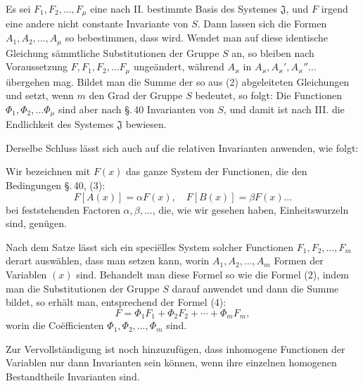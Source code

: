 Es sei $F_1, F_2, \ldots, F_\mu$ eine nach II. bestimmte Basis des Systemes $\mathfrak{J}$, und $F$ irgend eine andere nicht constante Invariante von $S$. Dann lassen sich die Formen $A_1, A_2, \ldots, A_\mu$ so bebestimmen, dass %
wird. Wendet man auf diese identische Gleichung sämmtliche Substitutionen der Gruppe $S$ an, so bleiben nach Voraussetzung $F, F_1, F_2, \ldots F_\mu$ ungeändert, während $A_\varkappa$ in $A_\varkappa, A_\varkappa', A_\varkappa'' \ldots$ übergehen mag. Bildet man die Summe der so aus (2) abgeleiteten Gleichungen und setzt, wenn $m$ den Grad der Gruppe $S$ bedeutet,
so folgt:
Die Functionen $\Phi_1, \Phi_2, \ldots \Phi_\mu$ sind aber nach \S.\,40 Invarianten von $S$, und damit ist nach III. die Endlichkeit des Systemes $\mathfrak{J}$ bewiesen.

Derselbe Schluss lässt sich auch auf die relativen Invarianten anwenden, wie folgt:

Wir bezeichnen mit $F(x)$ das ganze System der Functionen, die den Bedingungen \S.\,40, (3):
\[
F[A(x)] = \alpha F(x), \quad F[B(x)] = \beta F(x) \ldots
\]
bei feststehenden Factoren $\alpha, \beta, \ldots$, die, wie wir gesehen haben, Einheitswurzeln sind, genügen.

Nach dem  Satze lässt sich ein speci\"elles System solcher Functionen $F_1, F_2, \ldots, F_m$ derart auswählen, dass man
setzen kann, worin $A_1, A_2, \ldots, A_m$ Formen der Variablen $(x)$ sind. Behandelt man diese Formel so wie die Formel (2), indem man die Substitutionen der Gruppe $S$ darauf anwendet und dann die Summe bildet, so erhält man, entsprechend der Formel (4):
\[
F = \Phi_1F_1 + \Phi_2F_2 + \cdots + \Phi_mF_m,
\]
worin die Co\"efficienten $\Phi_1, \Phi_2, \ldots, \Phi_m$  sind.

Zur Vervollständigung ist noch hinzuzufügen, dass inhomogene Functionen der Variablen nur dann Invarianten sein können, wenn ihre einzelnen homogenen Bestandtheile Invarianten sind.
